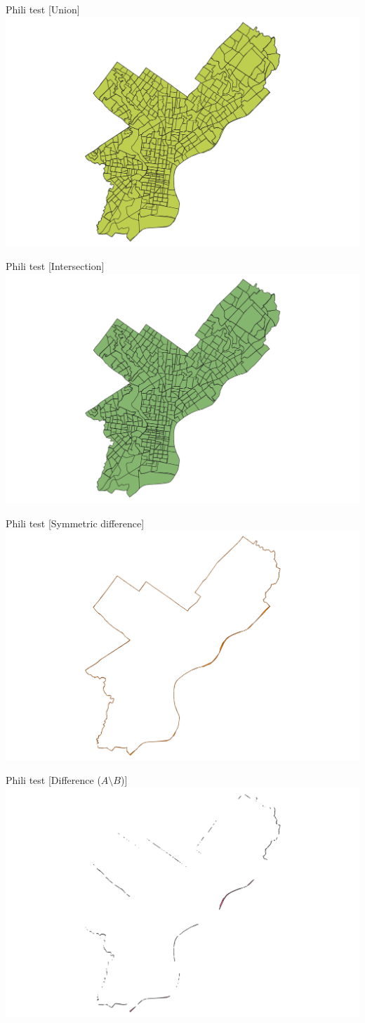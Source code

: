 \documentclass{beamer}
\begin{document}
\begin{frame}{Phili test [Union]}
    \centering 
    \includegraphics[trim=6cm 0cm 6cm 0cm, clip, width=0.6\linewidth]{figures/union} 
\end{frame}
\begin{frame}{Phili test [Intersection]}
    \centering 
    \includegraphics[trim=6cm 0cm 6cm 0cm, clip, width=0.6\linewidth]{figures/intersection} 
\end{frame}
\begin{frame}{Phili test [Symmetric difference]}
    \centering 
    \includegraphics[trim=6cm 0cm 6cm 0cm, clip, width=0.6\linewidth]{figures/symmetric} 
\end{frame}
\begin{frame}{Phili test [Difference ($A \setminus B$)]}
    \centering 
    \includegraphics[trim=6cm 0cm 6cm 0cm, clip, width=0.6\linewidth]{figures/differenceA} 
\end{frame}
\end{document}
